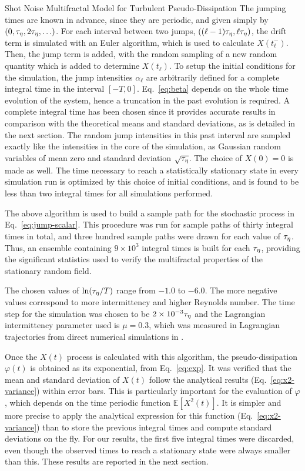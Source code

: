 \begin{chapter}{Shot Noise Multifractal Model for Turbulent Pseudo-Dissipation}
The jumping times are known in advance, since they are periodic, and given simply by $(0,\tau_{\eta},2 \tau_{\eta},\ldots)$. For each interval between two jumps, $((\ell-1)\tau_{\eta},\ell\tau_{\eta})$, the drift term is simulated with an Euler algorithm, which is used to calculate $X(t_{\ell}^-)$. Then, the jump term is added, with the random sampling of a new random quantity which is added to determine $X(t_{\ell})$.
To setup the initial conditions for the simulation, the jump intensities $\alpha_{\ell}$ are arbitrarily defined for a complete integral time in the interval $[-T,0]$. Eq.~\eqref{eq:beta} depends on the whole time evolution of the system, hence a truncation in the past evolution is required. A complete integral time has been chosen since it provides accurate results in comparison with the theoretical means and standard deviations, as is detailed in the next section. The random jump intensities in this past interval are sampled exactly like the intensities in the core of the simulation, as Gaussian random variables of mean zero and standard deviation $\sqrt{\tau_{\eta}}$. The choice of $X(0)=0$ is made as well.
The time necessary to reach a statistically stationary state in every simulation run is optimized by this choice of initial conditions, and is found to be less than two integral times for all simulations performed.

The above algorithm is used to build a sample path for the stochastic process in Eq.~\eqref{eq:jump-scalar}. This procedure was run for sample paths of thirty integral times in total, and three hundred sample paths were drawn for each value of $\tau_{\eta}$. Thus, an ensemble containing $9 \times 10^3$ integral times is built for each $\tau_{\eta}$, providing the significant statistics used to verify the multifractal properties of the stationary random field.

The chosen values of $\ln(\tau_{\eta}/T)$ range from $-1.0$ to $-6.0$. The more negative values correspond to more intermittency and higher Reynolds number.
The time step for the simulation was chosen to be $2 \times 10^{-3} \tau_{\eta}$ and the Lagrangian intermittency parameter used is $\mu = 0.3$,  which was measured in Lagrangian trajectories from direct numerical simulations in \textcite{huang2014}.

Once the $X(t)$ process is calculated with this algorithm, the pse\-udo-dis\-si\-pa\-tion $\varphi(t)$ is obtained as its exponential, from Eq.~\eqref{eq:exp}. It was verified that the mean and standard deviation of $X(t)$ follow the analytical results (Eq.~\ref{eq:x2-variance}) within error bars. This is particularly important for the evaluation of $\varphi$, which depends on the time periodic function $\mathbb{E}[X^2(t)]$. It is simpler and more precise to apply the analytical expression for this function (Eq.~\ref{eq:x2-variance}) than to store the previous integral times and compute standard deviations on the fly. For our results, the first five integral times were discarded, even though the observed times to reach a stationary state were always smaller than this. These results are reported in the next section.


\end{chapter}
